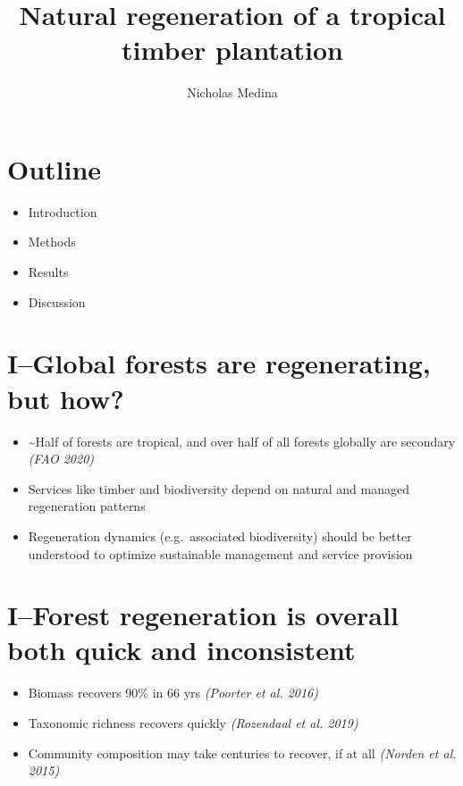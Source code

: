 \documentclass[
]{article}
\title{Natural regeneration of a tropical timber plantation}
\author{Nicholas Medina}
\date{}
\providecommand{\tightlist}{%
  \setlength{\itemsep}{0pt}\setlength{\parskip}{0pt}}
\begin{document}
\maketitle

\hypertarget{outline}{%
\section{Outline}\label{outline}}

\begin{itemize}
\tightlist
\item
  Introduction
\item
  Methods
\item
  Results
\item
  Discussion
\end{itemize}

\hypertarget{iglobal-forests-are-regenerating-but-how}{%
\section{I--Global forests are regenerating, but
how?}\label{iglobal-forests-are-regenerating-but-how}}

\begin{itemize}
\item
  \textasciitilde Half of forests are tropical, and over half of all
  forests globally are secondary \emph{(FAO 2020)}
\item
  Services like timber and biodiversity depend on natural and managed
  regeneration patterns
\item
  Regeneration dynamics (e.g.~associated biodiversity) should be better
  understood to optimize sustainable management and service provision
\end{itemize}

\hypertarget{iforest-regeneration-is-overall-both-quick-and-inconsistent}{%
\section{I--Forest regeneration is overall both quick and
inconsistent}\label{iforest-regeneration-is-overall-both-quick-and-inconsistent}}

\begin{itemize}
\item
  Biomass recovers 90\% in 66 yrs \emph{(Poorter et al. 2016)}
\item
  Taxonomic richness recovers quickly \emph{(Rozendaal et al. 2019)}
\item
  Community composition may take centuries to recover, if at all
  \emph{(Norden et al. 2015)}
\end{itemize}
\end{document}
